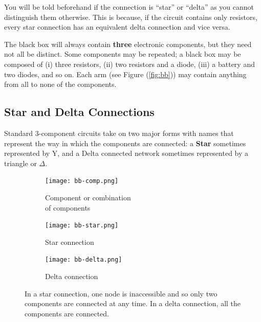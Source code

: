 \begin{refsection}
\begin{imp}
You will be told beforehand if the connection is ``star'' or ``delta'' as you cannot distinguish them otherwise. This is because, if the circuit contains only resistors, every star connection has an equivalent delta connection and vice versa.

The black box will always contain \textbf{three} electronic components, but they need not all be distinct. Some components may be repeated; a black box may be composed of (i) three resistors, (ii) two resistors and a diode, (iii) a battery and two diodes, and so on. Each arm (see Figure (\ref{fig:bb})) may contain anything from all to none of the components.
\end{imp}


\subsection*{Star and Delta Connections}

Standard 3-component circuits take on two major forms with names that represent the way in which the components are connected: a \textbf{Star} sometimes represented by Y, and a Delta connected network sometimes represented by a triangle or $\Delta$.

\begin{figure}[!htb]
       \begin{subfigure}[t]{0.3\textwidth}
				\centering
                \texttt{[image: bb-comp.png]}
                \captionsetup{justification=centering}
                \caption{Component or combination \\of components}
       \end{subfigure}%
       \begin{subfigure}[t]{0.3\textwidth}
				\centering
                \texttt{[image: bb-star.png]}
                \caption{Star connection}
        \end{subfigure}%
        \begin{subfigure}[t]{0.3\textwidth}
        		\centering
                \texttt{[image: bb-delta.png]}
                \caption{Delta connection}
        \end{subfigure}%
        \caption{In a star connection, one node is inaccessible and so only two components are connected at any time. In a delta connection, all the components are connected.}
        \label{fig:starAndDelta}
\end{figure}


\end{refsection}
